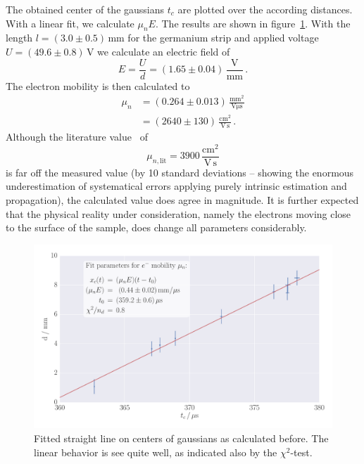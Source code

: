The obtained center of the gaussians $t_c$ are plotted over the 
according distances. With a linear fit, we calculate $\mu_n E$. 
The results are shown in figure~\ref{fig:h_s_mu_e_d}. 
With the length $l = (3.0 \pm 0.5)\,$mm for the germanium strip and 
applied voltage $U = (49.6 \pm 0.8)\,$V we calculate an electric field of 
\begin{equation}
    E = \frac{U}{d} = (1.65 \pm 0.04)\, \mathrm{\frac{V}{mm}}\, .
\end{equation}
The electron mobility is then calculated to 
\begin{equation}
    \begin{split}
        \mu_n   &= (0.264 \pm 0.013)\, \mathrm{\frac{mm^2}{V\mu s}} \\
                &= (2640 \pm 130)\, \mathrm{\frac{cm^2}{V\,s}} \,.
    \end{split}
\end{equation}
Although the literature value~\cite{staatsexamen} of 
\begin{equation}
    \mu_{n, \mathrm{lit}} = 3900\, \mathrm{\frac{cm^2}{V\,s}}
\end{equation}
is far off the measured value (by 10 standard deviations --  showing the 
    enormous underestimation of systematical errors applying purely 
    intrinsic estimation and propagation), the calculated value 
does agree in magnitude. It is further expected that the physical 
reality under consideration, namely the electrons moving close to the surface 
of the sample, does change all parameters considerably. 


\begin{figure}
    \includegraphics[width=1.0\textwidth]{figures/haynes_shockley_mu_e_d}
    \caption{
        Fitted straight line on centers of gaussians as calculated before. 
        The linear behavior is see quite well, as indicated also by the 
        $\chi^2$-test.
        }
    \label{fig:h_s_mu_e_d}
\end{figure}

